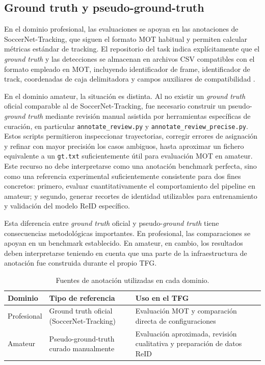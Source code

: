 \documentclass[../MAIN.tex]{subfiles}
\begin{document}
	\subsection{Ground truth y pseudo-ground-truth}
	
	En el dominio profesional, las evaluaciones se apoyan en las anotaciones de SoccerNet-Tracking, que siguen el formato MOT habitual y permiten calcular métricas estándar de tracking. El repositorio del task indica explícitamente que el \textit{ground truth} y las detecciones se almacenan en archivos CSV compatibles con el formato empleado en MOT, incluyendo identificador de frame, identificador de track, coordenadas de caja delimitadora y campos auxiliares de compatibilidad \parencite{soccernet_tracking_repo}.
	
	En el dominio amateur, la situación es distinta. Al no existir un \textit{ground truth} oficial comparable al de SoccerNet-Tracking, fue necesario construir un pseudo-\textit{ground truth} mediante revisión manual asistida por herramientas específicas de curación, en particular \texttt{annotate\_review.py} y \texttt{annotate\_review\_precise.py}. Estos scripts permitieron inspeccionar trayectorias, corregir errores de asignación y refinar con mayor precisión los casos ambiguos, hasta aproximar un fichero equivalente a un \texttt{gt.txt} suficientemente útil para evaluación MOT en amateur. Este recurso no debe interpretarse como una anotación benchmark perfecta, sino como una referencia experimental suficientemente consistente para dos fines concretos: primero, evaluar cuantitativamente el comportamiento del pipeline en amateur; y segundo, generar recortes de identidad utilizables para entrenamiento y validación del modelo ReID específico.
	
	Esta diferencia entre \textit{ground truth} oficial y pseudo-\textit{ground truth} tiene consecuencias metodológicas importantes. En profesional, las comparaciones se apoyan en un benchmark establecido. En amateur, en cambio, los resultados deben interpretarse teniendo en cuenta que una parte de la infraestructura de anotación fue construida durante el propio TFG.
	
	\begin{table}[H]
		\centering
		\caption{Fuentes de anotación utilizadas en cada dominio.}
		\label{tab:cap4_gt}
		\begin{tabular}{p{3.0cm}p{3.8cm}p{5.7cm}}
			\toprule
			\textbf{Dominio} & \textbf{Tipo de referencia} & \textbf{Uso en el TFG} \\
			\midrule
			Profesional & Ground truth oficial (SoccerNet-Tracking) & Evaluación MOT y comparación directa de configuraciones \\
			Amateur & Pseudo-ground-truth curado manualmente & Evaluación aproximada, revisión cualitativa y preparación de datos ReID \\
			\bottomrule
		\end{tabular}
	\end{table}
	
\end{document}

